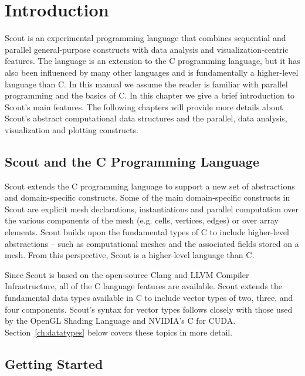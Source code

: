 \let\clearforchapter\par %

\chapter{Introduction}

Scout is an experimental programming language that combines sequential and parallel
general-purpose constructs with data analysis and visualization-centric features.  
The language is an extension to the C programming language, but 
it has also been influenced by many other languages and is fundamentally a higher-level 
language than C.  In this manual we assume the reader is familiar with parallel 
programming and the basics of C.  In this chapter we give a brief
introduction to Scout's main features.
The following chapters will provide more details about Scout's abstract 
computational data structures and the parallel, data analysis, visualization and plotting 
constructs.

\section{Scout and the C Programming Language}
\label{ch1:scout-clang}

Scout extends the C programming language to support a new set of abstractions and
domain-specific constructs.  Some of the main domain-specific constructs in Scout are
explicit mesh declarations, instantiations and parallel
computation over the various components of the mesh (e.g. cells, vertices, edges) or
over array elements.  Scout builds upon the fundamental types of C to include higher-level 
abstractions -- such 
as computational meshes and the associated fields stored on a mesh.  From this perspective, 
Scout is a higher-level language than C.

Since Scout is based on the open-source Clang and LLVM Compiler Infrastructure, all of 
the C language features are available. 
Scout extends the fundamental data types
available in C to include vector types of two, three, and four components.  Scout's 
syntax for vector types follows closely with those used by the OpenGL Shading Language
and NVIDIA's C for CUDA.  Section~\ref{ch:datatypes} below covers these topics in more 
detail.

\section{Getting Started}
\label{ch1:started}

